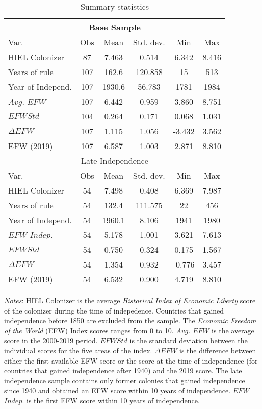 \begin{table}[h!]
\centering
\begin{threeparttable}
\caption{Summary statistics}\label{tab:Tab1}
\begin{tabular*}{\textwidth}{@{\extracolsep{\fill}}lccccc@{\extracolsep{\fill}}}
\midrule
\midrule
\multicolumn{6}{c}{Base Sample}\\
\midrule
 Var. & Obs       & Mean   & Std. dev. &      Min    &    Max \\
\midrule
HIEL Colonizer & 87 &   7.463   & 0.514   & 6.342  & 8.416 \\
Years of rule & 107 & 162.6 & 120.858 & 15 & 513 \\
Year of Independ. & 107 & 1930.6 & 56.783 & 1781 & 1984 \\
$Avg.$ $EFW$ & 107 & 6.442 & 0.959 &  3.860  & 8.751 \\
$EFWStd$ & 104 & 0.264  &  0.171 &  0.068 &  1.031 \\
$\Delta EFW$ & 107 & 1.115 & 1.056 & -3.432 & 3.562 \\
EFW (2019) & 107 & 6.587 & 1.003 & 2.871 & 8.810 \\
\midrule
\midrule
\multicolumn{6}{c}{Late Independence} \\
\midrule
Var. & Obs & Mean & Std. dev. & Min & Max \\
\midrule
HIEL Colonizer &  54  &  7.498  &  0.408 &  6.369 &   7.987\\
Years of rule & 54 & 132.4 & 111.575 & 22 & 456 \\
Year of Independ. & 54 & 1960.1 & 8.106 & 1941 & 1980 \\
$EFW$ $Indep.$ & 54 & 5.178 & 1.001 &  3.621  & 7.613 \\
$EFWStd$ & 54 & 0.750 & 0.324 & 0.175 & 1.567 \\
$\Delta EFW$ & 54 & 1.354 & 0.932 & -0.776 & 3.457 \\
EFW (2019) & 54 & 6.532 & 0.900 & 4.719 & 8.810 \\
\hline
\hline
\end{tabular*}
\begin{tablenotes}
\small
\item \textit{Notes}: HIEL Colonizer is the average \textit{Historical Index of Economic Liberty} score of the colonizer during the time of indepedence. Countries that gained independence before 1850 are excluded from the sample. The \textit{Economic Freedom of the World} (EFW) Index scores ranges from 0 to 10. $Avg.$ $EFW$ is the average score in the 2000-2019 period. $EFWStd$ is the standard deviation between the individual scores for the five areas of the index. $\Delta EFW$ is the difference between either the first available EFW score or the score at the time of independence (for countries that gained independence after 1940) and the 2019 score. The late independence sample contains only former colonies that gained independence since 1940 and obtained an EFW score within 10 years of independence. $EFW$ $Indep.$ is the first EFW score within 10 years of independence.
\end{tablenotes}
\end{threeparttable}
\end{table}
